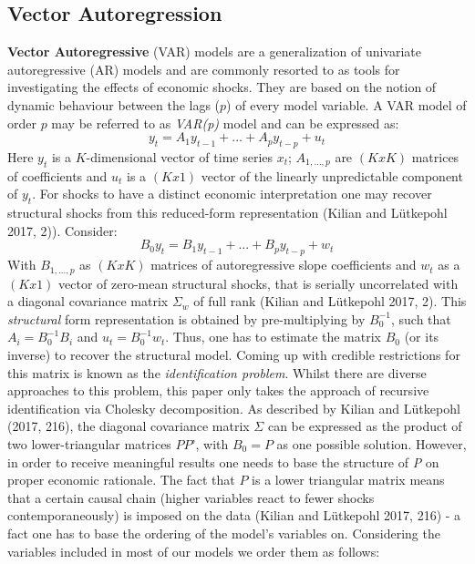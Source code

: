 \documentclass[12pt,]{article}
\begin{document}
\subsection{Vector Autoregression}\label{vector-autoregression}

\textbf{Vector Autoregressive} (VAR) models are a generalization of
univariate autoregressive (AR) models and are commonly resorted to as
tools for investigating the effects of economic shocks. They are based
on the notion of dynamic behaviour between the lags (\(p\)) of every
model variable. A VAR model of order \(p\) may be referred to as
\emph{VAR(p)} model and can be expressed as:
\[y_t = A_1 y_{t-1} + ... + A_p y_{t-p} + u_t\] Here \(y_t\) is a
\(K\)-dimensional vector of time series \(x_t\); \(A_{1, ..., p}\) are
\((K x K)\) matrices of coefficients and \(u_t\) is a \((K x 1)\) vector
of the linearly unpredictable component of \(y_t\). For shocks to have a
distinct economic interpretation one may recover structural shocks from
this reduced-form representation (Kilian and Lütkepohl 2017, 2)).
Consider: \[B_0 y_t = B_1 y_{t-1} + ... + B_p y_{t-p} + w_t\] With
\(B_{1, ..., p}\) as \((K x K)\) matrices of autoregressive slope
coefficients and \(w_t\) as a \((K x 1)\) vector of zero-mean structural
shocks, that is serially uncorrelated with a diagonal covariance matrix
\(\Sigma_w\) of full rank (Kilian and Lütkepohl 2017, 2). This
\emph{structural} form representation is obtained by pre-multiplying by
\(B_0^{-1}\), such that \(A_i = B_0^{-1} B_i\) and
\(u_t = B_0^{-1} w_t\). Thus, one has to estimate the matrix \(B_0\) (or
its inverse) to recover the structural model. Coming up with credible
restrictions for this matrix is known as the \emph{identification
problem}. Whilst there are diverse approaches to this problem, this
paper only takes the approach of recursive identification via Cholesky
decomposition. As described by Kilian and Lütkepohl (2017, 216), the
diagonal covariance matrix \(\Sigma\) can be expressed as the product of
two lower-triangular matrices \(PP’\), with \(B_0 = P\) as one possible
solution. However, in order to receive meaningful results one needs to
base the structure of \emph{P} on proper economic rationale. The fact
that \(P\) is a lower triangular matrix means that a certain causal
chain (higher variables react to fewer shocks contemporaneously) is
imposed on the data (Kilian and Lütkepohl 2017, 216) - a fact one has to
base the ordering of the model's variables on. Considering the variables
included in most of our models we order them as follows:
\end{document}
